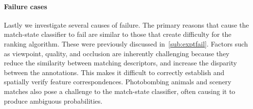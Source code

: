         \FloatBarrier{}





        
        \paragraph{Failure cases}

        Lastly we investigate several causes of failure.
        The primary reasons that cause the match-state classifier to fail are similar to those that create
          difficulty for the ranking algorithm.
        These were previously discussed in~\cref{sub:exptfail}.
        Factors such as viewpoint, quality, and occlusion are inherently challenging because they reduce the
          similarity between matching descriptors, and increase the disparity between the annotations.
        This makes it difficult to correctly establish and spatially verify feature correspondences.
        Photobombing animals and scenery matches also pose a challenge to the match-state classifier, often
          causing it to produce ambiguous probabilities.


